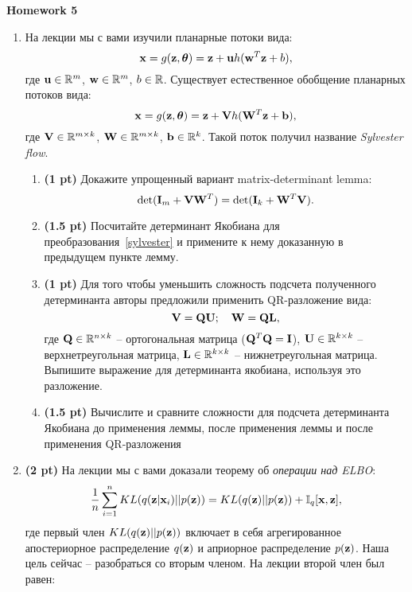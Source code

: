 \documentclass{article}
\begin{document}
\begin{center}
    {\Large \textbf{Homework 5}} \\
\end{center}

\begin{enumerate}
    \item На лекции мы с вами изучили планарные потоки вида:
    \begin{equation}
    	\mathbf{x} = g(\mathbf{z}, \boldsymbol{\theta}) = \mathbf{z} + \mathbf{u} h(\mathbf{w}^T\mathbf{z} + b),
    \end{equation}
    где $\mathbf{u} \in \mathbb{R}^m$,  $\mathbf{w} \in \mathbb{R}^m$, $b \in \mathbb{R}$.
    Существует естественное обобщение планарных потоков вида:
    \begin{equation}
    	\mathbf{x} = g(\mathbf{z}, \boldsymbol{\theta}) = \mathbf{z} + \mathbf{V} h(\mathbf{W}^T\mathbf{z} + \mathbf{b}),
    	\label{sylvester}
    \end{equation}
    где $\mathbf{V} \in \mathbb{R}^{m \times k}$,  $\mathbf{W} \in \mathbb{R}^{m \times k}$, $\mathbf{b} \in \mathbb{R}^k$. Такой поток получил название \textit{Sylvester flow}.
    \begin{enumerate}
    	\item  \textbf{(1 pt)} Докажите упрощенный вариант matrix-determinant lemma:
    	\[
    		\det (\mathbf{I}_m + \mathbf{V} \mathbf{W}^T) = \det (\mathbf{I}_k + \mathbf{W}^T \mathbf{V}).
    	\]
    	\item  \textbf{(1.5 pt)} Посчитайте детерминант Якобиана для преобразования~\eqref{sylvester} и примените к нему доказанную в предыдущем пункте лемму.
    	\item  \textbf{(1 pt)} Для того чтобы уменьшить сложность подсчета полученного детерминанта авторы предложили применить QR-разложение вида:
    	\[
    		\mathbf{V} = \mathbf{Q} \mathbf{U}; \quad \mathbf{W} = \mathbf{Q} \mathbf{L},
    	\]
    	где $\mathbf{Q} \in \mathbb{R}^{n \times k}$ -- ортогональная матрица ($\mathbf{Q}^T \mathbf{Q} = \mathbf{I}$), $\mathbf{U} \in \mathbb{R}^{k \times k}$ -- верхнетреугольная матрица, $\mathbf{L} \in \mathbb{R}^{k \times k}$ -- нижнетреугольная матрица. Выпишите выражение для детерминанта якобиана, используя это разложение. 
    	\item  \textbf{(1.5 pt)} Вычислите и сравните сложности для подсчета детерминанта Якобиана до применения леммы, после применения леммы и после применения QR-разложения
    \end{enumerate}
    
    \item  \textbf{(2 pt)} На лекции мы с вами доказали теорему об \textit{операции над ELBO}:
    \[
    	\frac{1}{n} \sum_{i=1}^n KL(q(\mathbf{z} | \mathbf{x}_i) || p(\mathbf{z})) = KL(q(\mathbf{z}) || p(\mathbf{z})) + \mathbb{I}_{q} [\mathbf{x}, \mathbf{z}],
    \]
    где первый член $KL(q(\mathbf{z}) || p(\mathbf{z}))$ включает в себя агрегированное апостериорное распределение $q(\mathbf{z})$ и априорное распределение $p(\mathbf{z})$. Наша цель сейчас -- разобраться со вторым членом. На лекции второй член был равен:


\end{enumerate}
\end{document}
